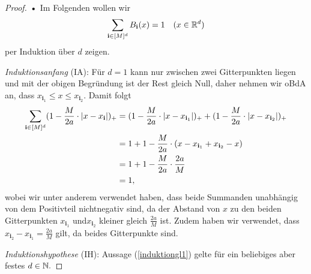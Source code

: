\begin{proof}
\textbf{•} Im Folgenden wollen wir 
\begin{equation}
\label{induktiongl1}
\sum_{\mathbf{i} \in [M]^d} B_{\mathbf{i}}(x) = 1 \quad (x \in \mathbb{R}^d)
\end{equation}
per Induktion über $d$ zeigen. 
	
	 \emph{Induktionsanfang} (IA): Für $d = 1$ kann nur zwischen zwei Gitterpunkten liegen und mit der obigen Begründung ist der Rest gleich Null, daher nehmen wir oBdA an, dass $x_{\mathbf{i}_1}\leq x \leq x_{\mathbf{i}_2}$. 
	Damit folgt 
	\begin{equation*}
	\begin{split}
	\sum_{\mathbf{i} \in [M]^d} (1 - \frac{M}{2a} \cdot |x - x_{\mathbf{i}}|)_+ & = (1 - \frac{M}{2a} \cdot |x - x_{\mathbf{i}_1}|)_+ + (1 - \frac{M}{2a} \cdot |x - x_{\mathbf{i}_2}|)_+ \\
	& = 1 + 1 - \frac{M}{2a} \cdot (x - x_{\mathbf{i}_1} + x_{\mathbf{i}_2} - x) \\
	& = 1 + 1 - \frac{M}{2a} \cdot \frac{2a}{M} \\
	& = 1,
	\end{split}
	\end{equation*} wobei wir unter anderem verwendet haben, dass beide Summanden unabhängig von dem Positivteil nichtnegativ sind, da der Abstand von $x$ zu den beiden Gitterpunkten $x_{\mathbf{i}_1}$ und$ x_{\mathbf{i}_2}$ kleiner gleich $\frac{2a}{M}$ ist. Zudem haben wir verwendet, dass $x_{\mathbf{i}_2} - x_{\mathbf{i}_1} = \frac{2a}{M}$ gilt, da beides Gitterpunkte sind.     
	
\emph{Induktionshypothese} (IH): Aussage (\ref{induktiongl1}) gelte für ein beliebiges aber festes $d \in \mathbb{N}.$


\end{proof}
